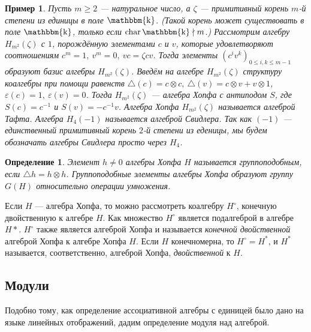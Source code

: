 \documentclass[12pt, reqno, a4paper, oneside, notitlepage]{amsart}
\theoremstyle{mytheoremstyle}
\theoremstyle{myremarkstyle}
\newtheorem{example}[theorem]{Пример}
\newtheorem{definition}[theorem]{Определение}
\numberwithin{equation}{section}
\DeclareMathOperator{\chr}{char}
\DeclareMathOperator{\fld}{\mathbbm{k}}
\begin{document}
\begin{example} \label{H_m^2}
  Пусть $m \geq 2$ --- натуральное число, а $\zeta$ --- примитивный корень $m$-й степени из единицы в поле $\fld$. 
  (Такой корень может существовать в поле $\fld$, только если $\chr \fld \nmid m$.)
  Рассмотрим алгебру $H_{m^2}(\zeta)$ с $1$, порождённую элементами $c$ и $v$, которые удовлетворяют соотношениям $c^m = 1,\ v^m = 0,\ vc = {\zeta}cv$.
  Тогда элементы $\left(c^iv^k\right)_{0 \leq i,k\leq m-1}$ образуют базис алгебры $H_{m^2}(\zeta)$.
  Введём на алгебре $H_{m^2}(\zeta)$ структуру коалгебры при помощи равенств $\triangle(c) = c \otimes c,\ \triangle(v) = c \otimes v + v \otimes 1$,
  $\varepsilon(c) = 1,\ \varepsilon(v) = 0$. Тогда $H_{m^2}(\zeta)$ --- алгебра Хопфа с антиподом $S$, где $S(c) = c^{-1}$ и $S(v) = -c^{-1}v$. Алгебра Хопфа $H_{m^2}(\zeta)$
  называется \textit{алгеброй Тафта}. Алгебра $H_4(-1)$ называется \textit{алгеброй Свидлера}. 
  Так как $(-1)$ --- единственный примитивный корень $2$-й степени из еденицы, мы будем обозначать алгебры Свидлера просто через $H_4$. 
\end{example}

\begin{definition} \label{Hopf group}
  Элемент $h \neq 0$ алгебры Хопфа $H$ называется \textit{группоподобным}, если $\triangle h = h \otimes h$. Группоподобные элементы алгебры Хопфа образуют группу $G(H)$ 
  относительно операции умножения.
\end{definition}


Если $H$ --- алгебра Хопфа, то можно рассмотреть коалгебру $H^\circ$, конечную двойственную к алгебре $H$. Как множество $H^\circ$ является подалгеброй в алгебре $H*$. 
$H^\circ$ также является алгеброй Хопфа и называется \textit{конечной двойственной} алгеброй Хопфа к алгебре Хопфа $H$. Если $H$ конечномерна, то $H^\circ = H^*$, и 
$H^*$ называется, соответственно, алгеброй Хопфа, \textit{двойственной} к $H$.

\subsection{Модули}

Подобно тому, как определение ассоциативной алгебры с единицей было дано на языке линейных отображений, дадим определение модуля над алгеброй.
\end{document}

